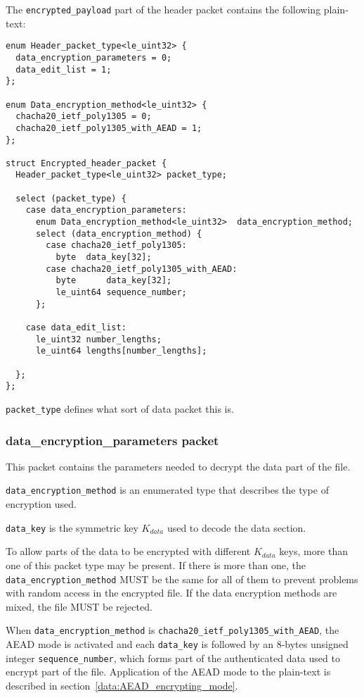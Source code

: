 \documentclass[10pt]{article}
\newcommand{\kw}[1]{\texttt{#1}}
\begin{document}
The \kw{encrypted\_payload} part of the header packet contains the following plain-text:

\begin{verbatim}
enum Header_packet_type<le_uint32> {
  data_encryption_parameters = 0;
  data_edit_list = 1;
};

enum Data_encryption_method<le_uint32> {
  chacha20_ietf_poly1305 = 0;
  chacha20_ietf_poly1305_with_AEAD = 1;
};

struct Encrypted_header_packet {
  Header_packet_type<le_uint32> packet_type;

  select (packet_type) {
    case data_encryption_parameters:
      enum Data_encryption_method<le_uint32>  data_encryption_method;
      select (data_encryption_method) {
        case chacha20_ietf_poly1305:
          byte  data_key[32];
        case chacha20_ietf_poly1305_with_AEAD:
          byte      data_key[32];
          le_uint64 sequence_number;
      };

    case data_edit_list:
      le_uint32 number_lengths;
      le_uint64 lengths[number_lengths];

  };
};
\end{verbatim}

\kw{packet\_type} defines what sort of data packet this is.

\subsubsection{data\_encryption\_parameters packet}\label{header:data_encryption_parameters}

This packet contains the parameters needed to decrypt the data part of the file.

\kw{data\_encryption\_method} is an enumerated type that describes the type of encryption used.

\kw{data\_key} is the symmetric key $K_{data}$ used to decode the data section.

To allow parts of the data to be encrypted with different $K_{data}$ keys,
more than one of this packet type may be present.
If there is more than one, the \kw{data\_encryption\_method} MUST be the same for all of them to prevent problems
with random access in the encrypted file. If the data encryption methods are mixed, the file MUST be rejected.

When \kw{data\_encryption\_method} is \kw{chacha20\_ietf\_poly1305\_with\_AEAD}, the AEAD mode is activated and each 
\kw{data\_key} is followed by an 8-bytes unsigned integer \kw{sequence\_number}, which forms part of the authenticated data used to encrypt part of the file.
Application of the AEAD mode to the plain-text is described in section~\ref{data:AEAD_encrypting_mode}.
\end{document}
